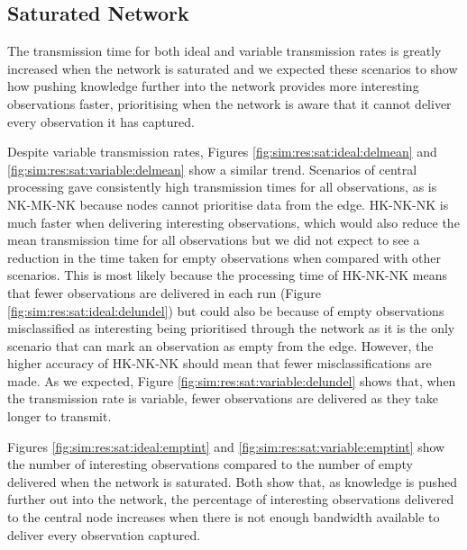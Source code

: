 \subsection{Saturated Network}
The transmission time for both ideal and variable transmission rates is greatly increased when the network is saturated and we expected these scenarios to show how pushing knowledge further into the network provides more interesting observations faster, prioritising when the network is aware that it cannot deliver every observation it has captured.

	Despite variable transmission rates, Figures \ref{fig:sim:res:sat:ideal:delmean} and \ref{fig:sim:res:sat:variable:delmean} show a similar trend. Scenarios of central processing gave consistently high transmission times for all observations, as is NK-MK-NK because nodes cannot prioritise data from the edge. HK-NK-NK is much faster when delivering interesting observations, which would also reduce the mean transmission time for all observations but we did not expect to see a reduction in the time taken for empty observations when compared with other scenarios. This is most likely because the processing time of HK-NK-NK means that fewer observations are delivered in each run (Figure \ref{fig:sim:res:sat:ideal:delundel}) but could also be because of empty observations misclassified as interesting being prioritised through the network as it is the only scenario that can mark an observation as empty from the edge. However, the higher accuracy of HK-NK-NK should mean that fewer misclassifications are made. As we expected, Figure \ref{fig:sim:res:sat:variable:delundel} shows that, when the transmission rate is variable, fewer observations are delivered as they take longer to transmit.

	Figures \ref{fig:sim:res:sat:ideal:emptint} and \ref{fig:sim:res:sat:variable:emptint} show the number of interesting observations compared to the number of empty delivered when the network is saturated. Both show that, as knowledge is pushed further out into the network, the percentage of interesting observations delivered to the central node increases when there is not enough bandwidth available to deliver every observation captured.
	
